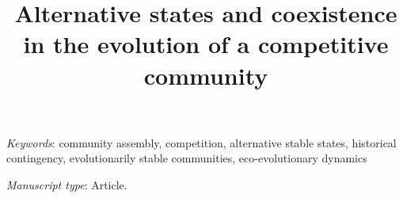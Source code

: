 \documentclass[11pt]{article}
\title{Alternative states and coexistence in the evolution of a competitive community}
\author{}
\date{}
\begin{document}
\maketitle


%

\bigskip


\bigskip


\textit{Keywords}: {
community assembly,
competition,
alternative stable states,
historical contingency,
evolutionarily stable communities,
eco-evolutionary dynamics}


\bigskip

\textit{Manuscript type}: Article.

\bigskip


\linenumbers{}
\modulolinenumbers[3]



\clearpage








\newpage{}









\end{document}
